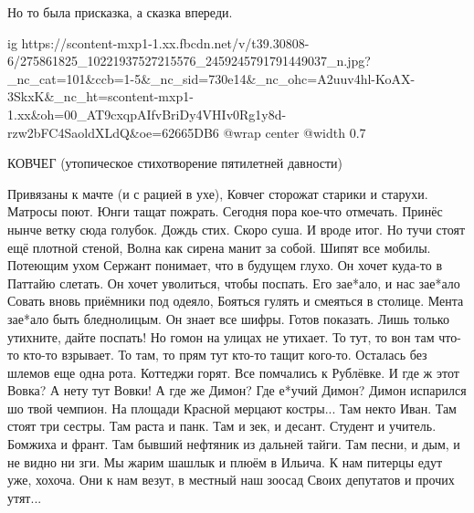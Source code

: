 Но то была присказка, а сказка впереди.

\ifcmt
  ig https://scontent-mxp1-1.xx.fbcdn.net/v/t39.30808-6/275861825_10221937527215576_2459245791791449037_n.jpg?_nc_cat=101&ccb=1-5&_nc_sid=730e14&_nc_ohc=A2uuv4hl-KoAX-3SkxK&_nc_ht=scontent-mxp1-1.xx&oh=00_AT9cxqpAIfvBriDy4VHIv0Rg1y8d-rzw2bFC4SaoldXLdQ&oe=62665DB6
  @wrap center
  @width 0.7
\fi

КОВЧЕГ (утопическое стихотворение пятилетней давности)

\raggedcolumns
\begin{multicols}{2} %
\setlength{\parindent}{0pt}

\obeycr
Привязаны к мачте (и с рацией в ухе),
Ковчег сторожат старики и старухи.
Матросы поют. Юнги тащат пожрать.
Сегодня пора кое-что отмечать.
Принёс нынче ветку сюда голубок.
\smallskip
Дождь стих. Скоро суша. И вроде итог.
Но тучи стоят ещё плотной стеной,
Волна как сирена манит за собой.
Шипят все мобилы. Потеющим ухом
Сержант понимает, что в будущем глухо.
\smallskip
Он хочет куда-то в Паттайю слетать.
Он хочет уволиться, чтобы поспать.
Его зае*ало, и нас зае*ало
Совать вновь приёмники под одеяло,
Бояться гулять и смеяться в столице.
\smallskip
Мента зае*ало быть бледнолицым.
Он знает все шифры. Готов показать.
Лишь только утихните, дайте поспать!
Но гомон на улицах не утихает.
То тут, то вон там что-то кто-то взрывает.
\smallskip
То там, то прям тут кто-то тащит кого-то.
Осталась без шлемов еще одна рота.
Коттеджи горят. Все помчались к Рублёвке.
\smallskip
И где ж этот Вовка? А нету тут Вовки!
А где же Димон? Где е*учий Димон?
Димон испарился шо твой чемпион.
На площади Красной мерцают костры...
\smallskip
Там некто Иван. Там стоят три сестры.
Там раста и панк. Там и зек, и десант.
Студент и учитель. Бомжиха и франт.
Там бывший нефтяник из дальней тайги.
\smallskip
Там песни, и дым, и не видно ни зги.
Мы жарим шашлык и плюём в Ильича.
К нам питерцы едут уже, хохоча.
Они к нам везут, в местный наш зоосад
Своих депутатов и прочих утят...
\restorecr
\end{multicols} %
